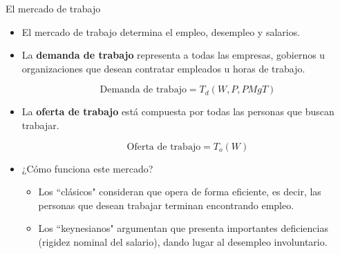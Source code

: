 \documentclass{beamer}
\begin{document}
\begin{frame}{El mercado de trabajo}
\begin{itemize}
    \item El mercado de trabajo determina el empleo, desempleo y salarios. \vspace{1mm}
    \item La \textbf{demanda de trabajo} representa a todas las empresas, gobiernos u organizaciones que desean contratar empleados u horas de trabajo. 
            \begin{center}
            \begin{tcolorbox}[width=3.5in,boxsep=0pt, left=0pt, right=0pt, top=0pt,colframe = blue!70!black, colback = blue!7!white]%
             $$ \text{Demanda de trabajo}= T_d (W, P, PMgT)$$
             \end{tcolorbox}
             \end{center}
             \vspace{1mm} 
    \item La \textbf{oferta de trabajo} está compuesta por todas las personas que buscan trabajar. 
         \begin{center}
            \begin{tcolorbox}[width=3in, boxsep=0pt, left=0pt, right=0pt, top=2pt, ,colframe = blue!70!black, colback = blue!7!white]%
              $$\text{Oferta de trabajo}= T_o (W)$$
             \end{tcolorbox}
             \end{center}
    \item ¿Cómo funciona este mercado?
    \begin{itemize}
        \item Los ``clásicos" consideran que opera de forma eficiente, es decir, las personas que desean trabajar terminan encontrando empleo.
        \item Los ``keynesianos" argumentan que presenta importantes deficiencias (rigidez nominal del salario), dando lugar al desempleo involuntario.
    \end{itemize}
\end{itemize}
\end{frame}
\end{document}
